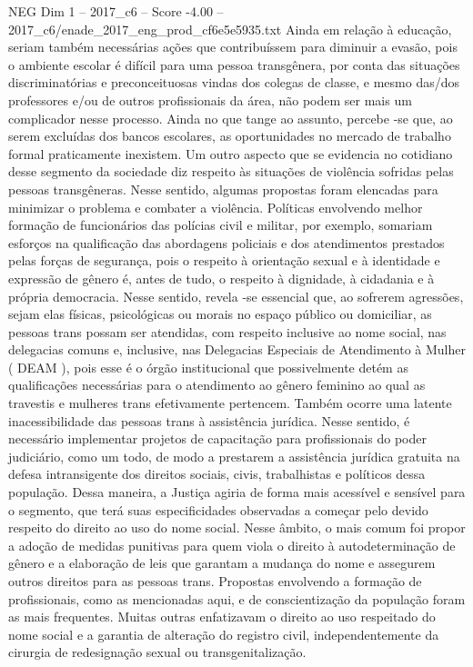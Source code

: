 \begin{textsample}{NEG Dim 1 – 2017\_c6 – Score -4.00 – 2017\_c6/enade\_2017\_eng\_prod\_cf6e5e5935.txt}
Ainda em relação à educação, seriam também necessárias ações que contribuíssem para diminuir a evasão, pois o ambiente escolar é difícil para uma pessoa transgênera, por conta das situações discriminatórias e preconceituosas vindas dos colegas de classe, e mesmo das/dos professores e/ou de outros profissionais da área, não podem ser mais um complicador nesse processo.
Ainda no que tange ao assunto, percebe -se que, ao serem excluídas dos bancos escolares, as oportunidades no mercado de trabalho formal praticamente inexistem.
Um outro aspecto que se evidencia no cotidiano desse segmento da sociedade diz respeito às situações de violência sofridas pelas pessoas transgêneras.
Nesse sentido, algumas propostas foram elencadas para minimizar o problema e combater a violência.
Políticas envolvendo melhor formação de funcionários das polícias civil e militar, por exemplo, somariam esforços na qualificação das abordagens policiais e dos atendimentos prestados pelas forças de segurança, pois o respeito à orientação sexual e à identidade e expressão de gênero é, antes de tudo, o respeito à dignidade, à cidadania e à própria democracia.
Nesse sentido, revela -se essencial que, ao sofrerem agressões, sejam elas físicas, psicológicas ou morais no espaço público ou domiciliar, as pessoas trans possam ser atendidas, com respeito inclusive ao nome social, nas delegacias comuns e, inclusive, nas Delegacias Especiais de Atendimento à Mulher ( DEAM ), pois esse é o órgão institucional que possivelmente detém as qualificações necessárias para o atendimento ao gênero feminino ao qual as travestis e mulheres trans efetivamente pertencem.
Também ocorre uma latente inacessibilidade das pessoas trans à assistência jurídica.
Nesse sentido, é necessário implementar projetos de capacitação para profissionais do poder judiciário, como um todo, de modo a prestarem a assistência jurídica gratuita na defesa intransigente dos direitos sociais, civis, trabalhistas e políticos dessa população.
Dessa maneira, a Justiça agiria de forma mais acessível e sensível para o segmento, que terá suas especificidades observadas a começar pelo devido respeito do direito ao uso do nome social.
Nesse âmbito, o mais comum foi propor a adoção de medidas punitivas para quem viola o direito à autodeterminação de gênero e a elaboração de leis que garantam a mudança do nome e assegurem outros direitos para as pessoas trans.
Propostas envolvendo a formação de profissionais, como as mencionadas aqui, e de conscientização da população foram as mais frequentes.
Muitas outras enfatizavam o direito ao uso respeitado do nome social e a garantia de alteração do registro civil, independentemente da cirurgia de redesignação sexual ou transgenitalização.

\end{textsample}
